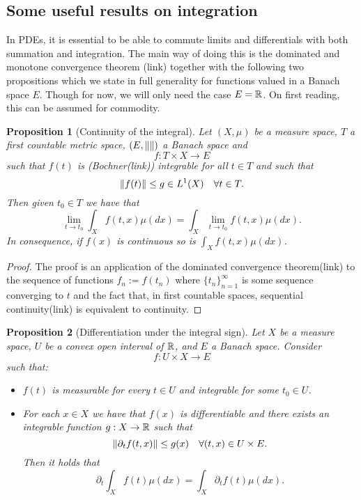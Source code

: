 \documentclass[12pt]{article}
\newtheorem{proposition}{Proposition}
\begin{document}
\subsection*{Some useful results on integration}
In PDEs, it is essential to be able to commute limits and differentials with both summation and integration. The main way of doing this is the dominated and monotone convergence theorem (link) together with the following two propositions which we state in full generality for functions valued in a Banach space $E$. Though for now, we will only need the case $E={\mathbb R}$. On first reading, this can be assumed for commodity.
\begin{proposition}[Continuity of the integral]\label{commuting limits with integral}
	Let $(X,\mu )$ be a measure space, $T$ a first countable metric space, $(E,\norm{})$ a Banach space and
	\[f:T\times X\to E\]
	such that $f(t)$ is (Bochner(link)) integrable for all ${t}\in{T}$ and such that
	\[\norm{f(t)}\leq g\in L^1(X)\quad \forall{t}\in {T}.\]
	Then given $t_0\in T$ we have that
	\[\lim_{t\to t_0}\int_X f(t,x)\mu(dx) =\int_X\lim_{t\to t_0}f(t,x)\mu(dx) .\]
	In consequence, if $f(x)$ is continuous so is $\int_X f(t,x) \mu(dx)$.
\end{proposition}
\begin{proof}
	The proof is an application of the dominated convergence theorem(link) to the
	sequence of functions $f_n:=f(t_n)$ where $\{t_n\}_{n=1}^\infty$ is some sequence converging to $t$ and the fact that, in first countable spaces, sequential continuity(link) is equivalent to continuity.
\end{proof}
\begin{proposition}[{Differentiation under the integral sign}]\label{derivationundertheintsign}
	Let $X$ be a measure space,  $U$ be a convex open interval of ${\mathbb R}$, and $E$ a Banach space. Consider \[f:U\times X\to E\] such that:
	\begin{itemize}[a)]
		\item $ f(t)$ is measurable for every $t\in U$ and integrable for some $t_0\in U$.
		\item  For each $x\in X$ we have that $f(x)$ is differentiable and there exists an integrable function $g: X\to{\mathbb R}$ such that
		      \[\norm{\partial_{t}{f}(t,x)}\leq g(x)\quad \forall{(t,x)}\in {U\times E}.\]
		      Then it holds that
		      \[\partial_{t}{\int_X f(t)\mu(dx)}=\int_X \partial_{t}f(t) \mu(dx).\]

	\end{itemize}
\end{proposition}
\end{document}
